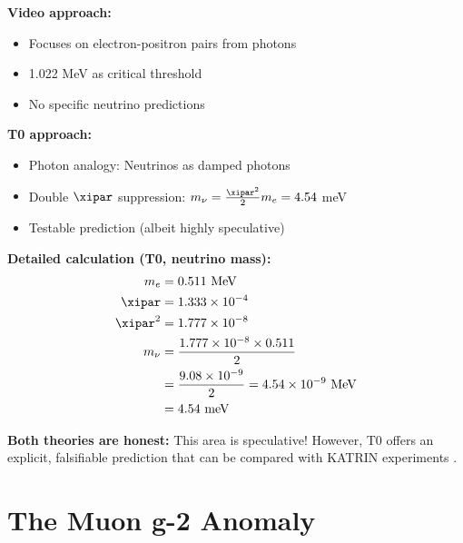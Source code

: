 	\begin{vergleich}
		\textbf{Video approach:}
		\begin{itemize}
			\item Focuses on electron-positron pairs from photons
			\item 1.022 MeV as critical threshold
			\item No specific neutrino predictions
		\end{itemize}
		
		\textbf{T0 approach:}
		\begin{itemize}
			\item Photon analogy: Neutrinos as damped photons
			\item Double $\xipar$ suppression: $m_\nu = \frac{\xipar^2}{2} m_e = 4.54$ meV
			\item Testable prediction (albeit highly speculative)
		\end{itemize}
		
		\textbf{Detailed calculation (T0, neutrino mass):}
		\begin{align}
			m_e &= 0.511 \text{ MeV} \\
			\xipar &= 1.333 \times 10^{-4} \\
			\xipar^2 &= 1.777 \times 10^{-8} \\
			m_\nu &= \frac{1.777 \times 10^{-8} \times 0.511}{2} \\
			&= \frac{9.08 \times 10^{-9}}{2} = 4.54 \times 10^{-9} \text{ MeV} \\
			&= 4.54 \text{ meV}
		\end{align}
	\end{vergleich}
	
	\textbf{Both theories are honest:} This area is speculative! However, T0 offers an explicit, falsifiable prediction that can be compared with KATRIN experiments \cite{katrin_2022}.
	
	\section{The Muon g-2 Anomaly}
	
